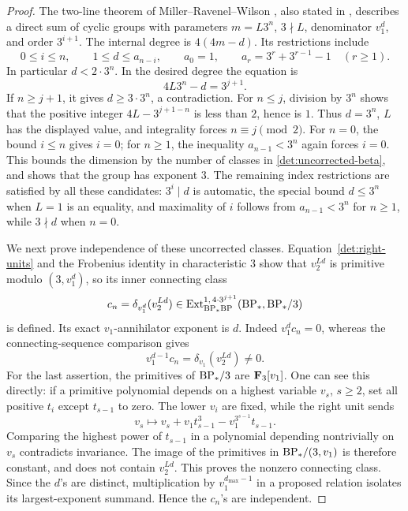 \begin{proof}
The two-line theorem of Miller--Ravenel--Wilson
\cite[Theorem~2.6]{MRW}, also stated in
\cite[Corollary~5.4.5(a)]{Ravenel}, describes a direct sum of cyclic
groups with parameters \(m=L3^n\), \(3\nmid L\), denominator
\(v_1^d\), and order \(3^{i+1}\).  The internal degree is
\(4(4m-d)\).  Its restrictions include
\[
 0\leq i\leq n,\qquad
 1\leq d\leq a_{n-i},\qquad
 a_0=1,\qquad a_r=3^r+3^{r-1}-1\quad(r\geq1).
\]
In particular \(d<2\cdot3^n\).
In the desired degree the equation is
\[
 4L3^n-d=3^{j+1}.
\]
If \(n\geq j+1\), it gives \(d\geq3\cdot3^n\), a contradiction.
For \(n\leq j\), division by \(3^n\) shows that the positive
integer \(4L-3^{j+1-n}\) is less than \(2\), hence is \(1\).
Thus \(d=3^n\), \(L\) has the displayed value, and integrality
forces \(n\equiv j\pmod2\).
For \(n=0\), the bound \(i\le n\) gives \(i=0\); for \(n\ge1\),
the inequality \(a_{n-1}<3^n\) again forces \(i=0\).
This bounds the dimension by the number of classes in
\eqref{det:uncorrected-beta}, and shows that the group has
exponent \(3\).
The remaining index restrictions are satisfied by all these candidates:
\(3^i\mid d\) is automatic, the special bound \(d\leq3^n\) when
\(L=1\) is an equality, and maximality of \(i\) follows from
\(a_{n-1}<3^n\) for \(n\geq1\), while \(3\nmid d\) when \(n=0\).

We next prove independence of these uncorrected classes.
Equation~\eqref{det:right-units} and the Frobenius identity in
characteristic \(3\) show that \(v_2^{Ld}\) is primitive modulo
\((3,v_1^d)\), so its inner connecting class
\[
 c_n=\delta_{v_1^d}(v_2^{Ld})
 \in\operatorname{Ext}_{\mathrm{BP}_*\mathrm{BP}}^{1,\,4\cdot3^{j+1}}(\mathrm{BP}_*,\mathrm{BP}_*/3)
\]
is defined.
Its exact \(v_1\)-annihilator exponent is \(d\).
Indeed \(v_1^d c_n=0\), whereas the connecting-sequence comparison
gives
\[
 v_1^{d-1}c_n=\delta_{v_1}(v_2^{Ld})\ne0.
\]
For the last assertion, the primitives of \(\mathrm{BP}_*/3\) are
\(\mathbf F_3[v_1]\).  One can see this directly: if a primitive
polynomial depends on a highest variable \(v_s\), \(s\geq2\),
set all positive \(t_i\) except \(t_{s-1}\) to zero.
The lower \(v_i\) are fixed, while the right unit sends
\[
 v_s\longmapsto
 v_s+v_1t_{s-1}^3-v_1^{3^{s-1}}t_{s-1}.
\]
Comparing the highest power of \(t_{s-1}\) in a polynomial
depending nontrivially on \(v_s\) contradicts invariance.
The image of the primitives in \(\mathrm{BP}_*/(3,v_1)\) is therefore
constant, and does not contain \(v_2^{Ld}\).
This proves the nonzero connecting class.
Since the \(d\)'s are distinct, multiplication by
\(v_1^{d_{\max}-1}\) in a proposed relation isolates its
largest-exponent summand.  Hence the \(c_n\)'s are independent.


\end{proof}
